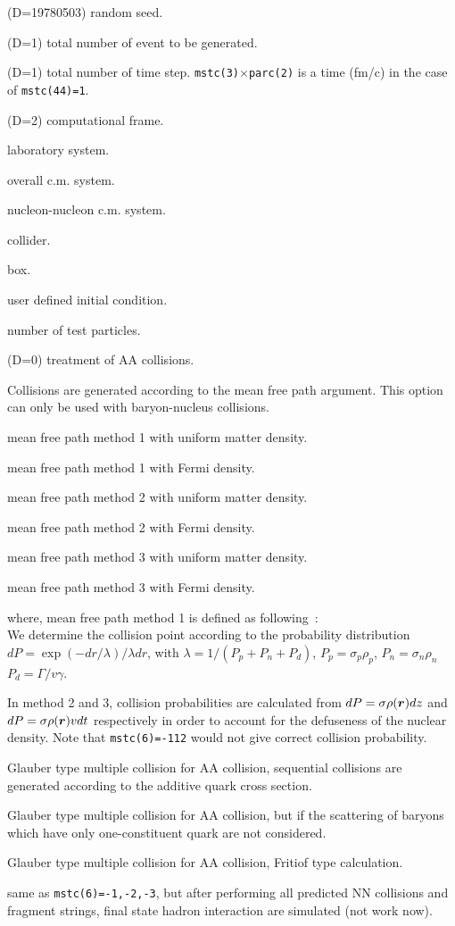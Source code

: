 \documentclass[]{article}
\newenvironment{entry}%
{\begin{list}{}{\setlength{\topsep}{0mm} \setlength{\itemsep}{0mm}
\setlength{\parskip}{0mm} \setlength{\parsep}{0mm}
\setlength{\leftmargin}{20mm} \setlength{\rightmargin}{0mm}
\setlength{\labelwidth}{18mm} \setlength{\labelsep}{2mm}}}%
{\end{list}}
\newenvironment{subentry}%
{\begin{list}{}{\setlength{\topsep}{0mm} \setlength{\itemsep}{0mm}
\setlength{\parskip}{0mm} \setlength{\parsep}{0mm}
\setlength{\leftmargin}{10mm} \setlength{\rightmargin}{0mm}
\setlength{\labelwidth}{18mm} \setlength{\labelsep}{2mm}}}%
{\end{list}}
\newcommand{\ttt}[1]{{\tt#1}}
\newcommand{\itemt}[1]{\item[{\tt #1}\hfill]}
\newcommand{\bold}[1]{\mbox{\boldmath $#1$}}    %
\newcommand{\rr}{{\bold{r}}}
\begin{document}
\begin{entry}
\itemt{mstc(1) :} (D=19780503) random seed.
\itemt{mstc(2) :} (D=1) total number of event to be generated.
\itemt{mstc(3) :} (D=1) total number of time step.
           \ttt{mstc(3)$\times$parc(2)} is a time (fm/c) in the case of
          \ttt{mstc(44)=1}.
\itemt{mstc(4) :} (D=2) computational frame.
 \begin{subentry}
        \itemt{$=0$:} laboratory system.
        \itemt{$=1$:} overall c.m. system.
        \itemt{$=2$:} nucleon-nucleon c.m. system.
        \itemt{$=3$:} collider.
       \itemt{$=10$:} box.
       \itemt{$=100$:} user defined initial condition.
 \end{subentry}
\itemt{mstc(5) :} number of test particles.
\itemt{mstc(6) :} (D=0) treatment of AA collisions.
   \begin{subentry}
      \itemt{$<-101$ :} Collisions are generated according to the 
                     mean free path argument. This option can only
                     be used with baryon-nucleus collisions.
      \itemt{$=-111$ :} mean free path method 1 with uniform matter density.
      \itemt{$=-112$ :} mean free path method 1 with Fermi density.
      \itemt{$=-121$ :} mean free path method 2 with uniform matter density.
      \itemt{$=-122$ :} mean free path method 2 with Fermi density.
      \itemt{$=-131$ :} mean free path method 3 with uniform matter density.
      \itemt{$=-132$ :} mean free path method 3 with Fermi density.

       where, mean free path method 1 is defined as following~\cite{KK}:\\
       We determine the collision point according to the probability
       distribution $dP=\exp(-dr/\lambda)/\lambda dr$,
       with $\lambda=1/(P_p+P_n+P_d)$,
       $P_p=\sigma_p\rho_p$, $P_n=\sigma_n\rho_n$
       $P_d=\Gamma/v\gamma$.

       In method 2 and 3, collision probabilities are
       calculated from 
       $dP=\sigma \rho(\rr)dz$ and $dP=\sigma \rho(\rr)v dt$ respectively
       in order to account for the defuseness of the nuclear density.
       Note that \ttt{mstc(6)=-112} would not give correct collision
       probability.


      \itemt{$=-3$ :} Glauber type multiple collision for AA collision,
                      sequential collisions are generated according to
                      the additive quark cross section.
      \itemt{$=-2$ :} Glauber type multiple collision for AA collision,
                      but if the scattering of baryons
                      which have only one-constituent quark are not 
                      considered.
      \itemt{$=-1$ :} Glauber type multiple collision for AA collision,
                      Fritiof type calculation.
      \itemt{$=-21,-22,-23$ :} same as \ttt{mstc(6)=-1,-2,-3},
      but after performing
       all predicted NN collisions and fragment strings,
       final state hadron interaction are simulated (not work now).


\end{subentry}
\end{entry}
\end{document}

